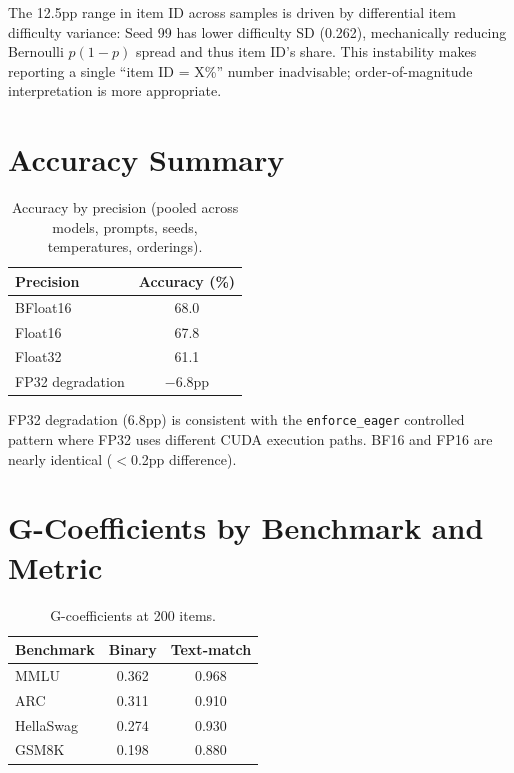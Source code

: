 \documentclass[11pt,twocolumn]{article}
\newcommand{\pct}{\%}
\begin{document}
The 12.5pp range in item ID across samples is driven by differential item difficulty variance: Seed 99 has lower difficulty SD (0.262), mechanically reducing Bernoulli $p(1-p)$ spread and thus item ID's share. This instability makes reporting a single ``item ID = X\pct{}'' number inadvisable; order-of-magnitude interpretation is more appropriate.

\section{Accuracy Summary}
\label{app:accuracy}

\begin{table}[h]
\centering
\caption{Accuracy by precision (pooled across models, prompts, seeds, temperatures, orderings).}
\begin{tabular}{@{}lc@{}}
\toprule
\textbf{Precision} & \textbf{Accuracy (\pct{})} \\
\midrule
BFloat16 & 68.0 \\
Float16  & 67.8 \\
Float32  & 61.1 \\
\midrule
FP32 degradation & $-$6.8pp \\
\bottomrule
\end{tabular}
\end{table}

FP32 degradation (6.8pp) is consistent with the \texttt{enforce\_eager} controlled pattern where FP32 uses different CUDA execution paths. BF16 and FP16 are nearly identical ($<$0.2pp difference).

\section{G-Coefficients by Benchmark and Metric}

\begin{table}[h]
\centering
\caption{G-coefficients at 200 items.}
\begin{tabular}{@{}lcc@{}}
\toprule
\textbf{Benchmark} & \textbf{Binary} & \textbf{Text-match} \\
\midrule
MMLU      & 0.362 & 0.968 \\
ARC       & 0.311 & 0.910 \\
HellaSwag & 0.274 & 0.930 \\
GSM8K     & 0.198 & 0.880 \\
\bottomrule
\end{tabular}
\end{table}
\end{document}
